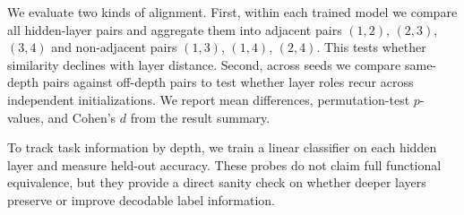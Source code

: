  We evaluate two kinds of alignment. First, within each trained model we compare all hidden-layer pairs and aggregate them into adjacent pairs $(1,2)$, $(2,3)$, $(3,4)$ and non-adjacent pairs $(1,3)$, $(1,4)$, $(2,4)$. This tests whether similarity declines with layer distance. Second, across seeds we compare same-depth pairs against off-depth pairs to test whether layer roles recur across independent initializations. We report mean differences, permutation-test $p$-values, and Cohen's $d$ from the result summary.

 To track task information by depth, we train a linear classifier on each hidden layer and measure held-out accuracy. These probes do not claim full functional equivalence, but they provide a direct sanity check on whether deeper layers preserve or improve decodable label information.


